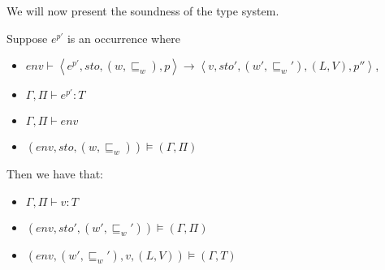 \documentclass[../../master.tex]{subfiles}
\begin{document}
We will now present the soundness of the type system.

\begin{theorem}
	Suppose $e^{p'}$ is an occurrence where
	\begin{itemize}
		\item $env\vdash\left\langle e^{p'},sto,(w,\sqsubseteq_w),p\right\rangle\rightarrow\left\langle v,sto',(w',\sqsubseteq_w'),(L,V),p''\right\rangle$,
		\item $\Gamma,\Pi\vdash e^{p'} : T$
		\item $\Gamma,\Pi\vdash env$
		\item $(env,sto,(w,\sqsubseteq_w))\models(\Gamma,\Pi)$
	\end{itemize}
	Then we have that:
	\begin{itemize}
		\item $\Gamma,\Pi\vdash v:T$
		\item $(env,sto',(w',\sqsubseteq_w'))\models(\Gamma,\Pi)$
		\item $(env,(w',\sqsubseteq_w'),v,(L,V))\models(\Gamma,T)$
	\end{itemize}
\end{theorem}

\end{document}
